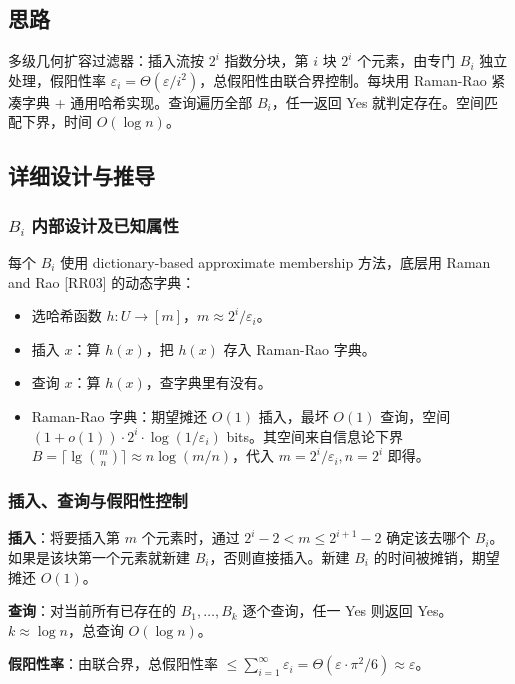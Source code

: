 \documentclass[UTF8,11pt,a4paper]{ctexart}
\begin{document}
\subsection{思路}

多级几何扩容过滤器：插入流按 $2^i$ 指数分块，第 $i$ 块 $2^i$ 个元素，由专门 $B_i$ 独立处理，假阳性率 $\varepsilon_i=\Theta(\varepsilon/i^2)$，总假阳性由联合界控制。每块用 Raman-Rao 紧凑字典 + 通用哈希实现。查询遍历全部 $B_i$，任一返回 Yes 就判定存在。空间匹配下界，时间 $O(\log n)$。

\subsection{详细设计与推导}

\subsubsection{$B_i$ 内部设计及已知属性}

每个 $B_i$ 使用 dictionary-based approximate membership 方法，底层用 Raman and Rao [RR03] 的动态字典：
\begin{itemize}
    \item 选哈希函数 $h: U \to [m]$，$m \approx 2^i / \varepsilon_i$。
    \item 插入 $x$：算 $h(x)$，把 $h(x)$ 存入 Raman-Rao 字典。
    \item 查询 $x$：算 $h(x)$，查字典里有没有。
    \item Raman-Rao 字典：期望摊还 $O(1)$ 插入，最坏 $O(1)$ 查询，空间 $(1+o(1)) \cdot 2^i \cdot \log(1/\varepsilon_i)$ bits。其空间来自信息论下界 $B = \lceil\lg\binom{m}{n}\rceil \approx n\log(m/n)$，代入 $m=2^i/\varepsilon_i, n=2^i$ 即得。
\end{itemize}

\subsubsection{插入、查询与假阳性控制}

\textbf{插入}：将要插入第 $m$ 个元素时，通过 $2^i - 2 < m \le 2^{i+1}-2$ 确定该去哪个 $B_i$。如果是该块第一个元素就新建 $B_i$，否则直接插入。新建 $B_i$ 的时间被摊销，期望摊还 $O(1)$。

\textbf{查询}：对当前所有已存在的 $B_1, \dots, B_k$ 逐个查询，任一 Yes 则返回 Yes。$k \approx \log n$，总查询 $O(\log n)$。

\textbf{假阳性率}：由联合界，总假阳性率 $\le \sum_{i=1}^{\infty} \varepsilon_i = \Theta(\varepsilon \cdot \pi^2/6) \approx \varepsilon$。
\end{document}
